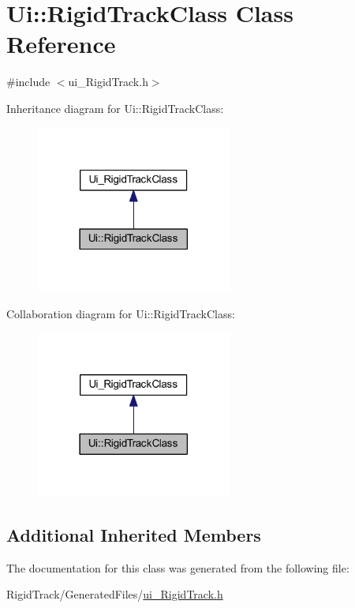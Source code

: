 \hypertarget{class_ui_1_1_rigid_track_class}{}\section{Ui\+:\+:Rigid\+Track\+Class Class Reference}
\label{class_ui_1_1_rigid_track_class}


{\ttfamily \#include $<$ui\+\_\+\+Rigid\+Track.\+h$>$}



Inheritance diagram for Ui\+:\+:Rigid\+Track\+Class\+:\nopagebreak
\begin{figure}[H]
\begin{center}
\leavevmode
\includegraphics[width=182pt]{class_ui_1_1_rigid_track_class__inherit__graph}
\end{center}
\end{figure}


Collaboration diagram for Ui\+:\+:Rigid\+Track\+Class\+:\nopagebreak
\begin{figure}[H]
\begin{center}
\leavevmode
\includegraphics[width=182pt]{class_ui_1_1_rigid_track_class__coll__graph}
\end{center}
\end{figure}
\subsection*{Additional Inherited Members}


The documentation for this class was generated from the following file\+:\begin{DoxyCompactItemize}
\item 
Rigid\+Track/\+Generated\+Files/\hyperlink{ui___rigid_track_8h}{ui\+\_\+\+Rigid\+Track.\+h}\end{DoxyCompactItemize}
